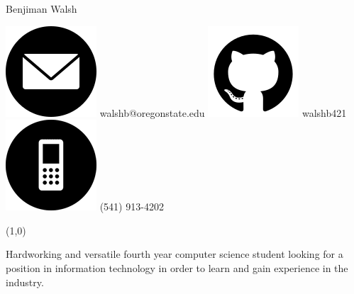 \documentclass[12pt,letterpaper]{article}
\begin{document}
	\centering
	{\huge
		Benjiman Walsh
	}

	\vspace{0.5cm}

	\includegraphics[scale=0.15]{./images/email_icon}
	walshb@oregonstate.edu	
	\hspace{1cm}
	\includegraphics[scale=0.15]{./images/github_icon}
	walshb421
	\hspace{1cm}
	\includegraphics[scale=0.15]{./images/phone_icon}
	(541) 913-4202

	\noindent
	\line(1,0){\textwidth}
	
	
	\raggedright

	Hardworking and versatile fourth year computer science student looking for a position
	in information technology in order to learn and gain experience in the industry.
	
	\hspace{1cm}
	
\end{document}
